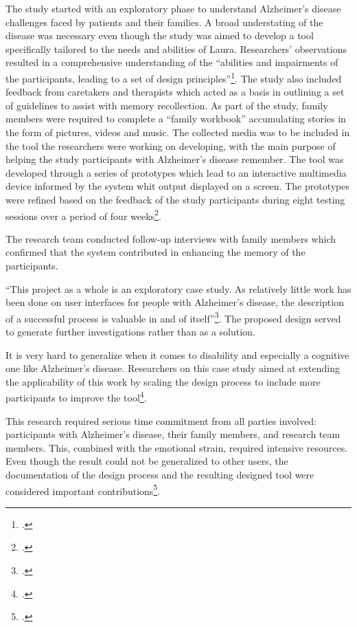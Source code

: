 The study started with an exploratory phase to understand Alzheimer’s disease challenges faced by patients and their families. A broad understating of the disease was necessary even though the study was aimed to develop a tool specifically tailored to the needs and abilities of Laura.  Researchers’ observations resulted in a comprehensive understanding of the ``abilities and impairments of the participants, leading to a set of design principles''\footcite{Cohene2007}. The study also included feedback from caretakers and therapists which acted as a basis in outlining a set of guidelines to assist with memory recollection. As part of the study, family members were required to complete a ``family workbook'' accumulating stories in the form of pictures, videos and music.  The collected media was to be included in the tool the researchers were working on developing, with the main purpose of helping the study participants with Alzheimer’s disease remember.   
The tool was developed through a series of prototypes which lead to an interactive multimedia device informed by the system whit output displayed on a screen.  The prototypes were refined based on the feedback of the study participants during eight testing sessions over a period of four weeks\footcite{Cohene2007}. 

The research team conducted follow-up interviews with family members which confirmed that the system contributed in enhancing the memory of the participants. 

``This project as a whole is an exploratory case study. As relatively little work has been done on user interfaces for people with Alzheimer’s disease, the description of a successful process is valuable in and of itself''\footcite{Cohene2007}. The proposed design served to generate further investigations rather than as a solution.

It is very hard to generalize when it comes to disability and especially a cognitive one like Alzheimer’s disease. Researchers on this case study aimed at extending the applicability of this work by scaling the design process to include more participants to improve the tool\footcite{Cohene2007}.

This research required serious time commitment from all parties involved: participants with Alzheimer’s disease, their family members, and research team members. This, combined with the emotional strain, required intensive resources.  Even though the result could not be generalized to other users, the documentation of the design process and the resulting designed tool were considered important contributions\footcite{Cohene2007}.

